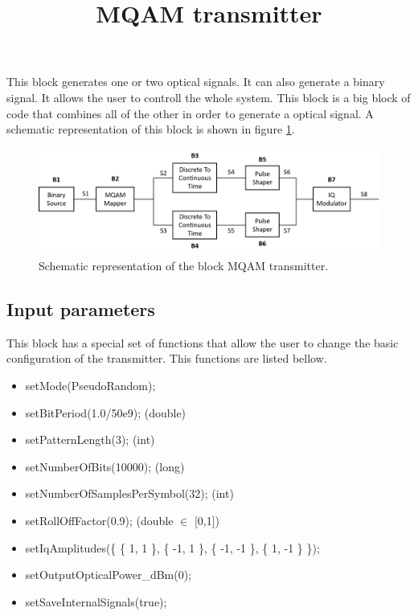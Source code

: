 \documentclass[a4paper]{article}
\title{MQAM transmitter}
\begin{document}
\maketitle
This block generates one or two optical signals. It can also generate a binary signal. It allows the user to controll the whole system. This block is a big block of code that combines all of the other in order to generate a optical signal. A schematic representation of this block is shown in figure \ref{MQAM_transmitter_block_diagram}.

\begin{figure}
	\centering
	\includegraphics[width=\textwidth]{MQAM_transmitter_block_diagram}
	\caption{Schematic representation of the block MQAM transmitter.}\label{MQAM_transmitter_block_diagram}
\end{figure}

\subsection*{Input parameters}

This block has a special set of functions that allow the user to change the basic configuration of the transmitter. This functions are listed bellow.

\begin{itemize}
	\item setMode(PseudoRandom);
	\item setBitPeriod(1.0/50e9);
	\linebreak (double)
	\item setPatternLength(3);
	\linebreak (int)
	\item setNumberOfBits(10000);
	\linebreak (long)
	\item setNumberOfSamplesPerSymbol(32);
	\linebreak (int)
	\item setRollOffFactor(0.9);
	\linebreak (double $\in$ [0,1])
	\item setIqAmplitudes(\{ \{ 1, 1 \}, \{ -1, 1 \}, \{ -1, -1 \}, \{ 1, -1 \} \});
	\item setOutputOpticalPower\_dBm(0);
	\item setSaveInternalSignals(true);
\end{itemize}
\end{document}
